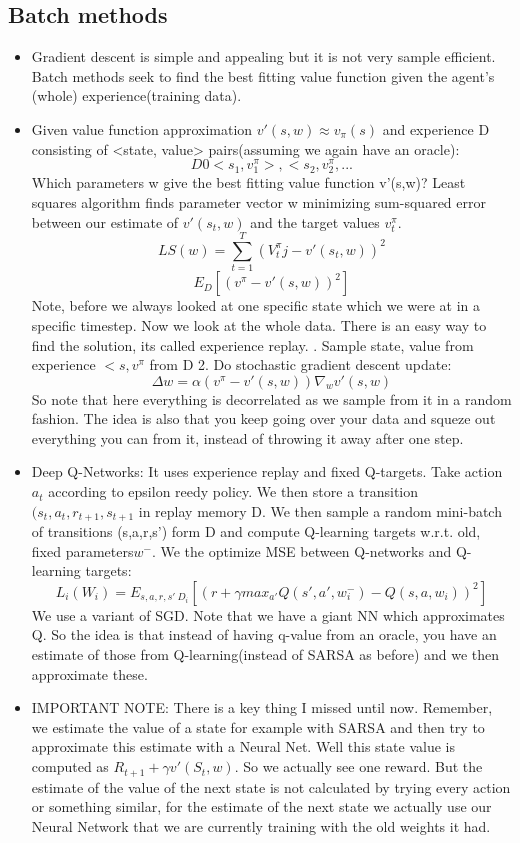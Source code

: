 \documentclass[a4paper]{article}
\begin{document}
\subsection{Batch methods}
\begin{itemize}
    \item Gradient descent is simple and appealing but it is not very sample efficient. Batch methods seek to find the best fitting value function given the agent's (whole) experience(training data). 
    \item Given value function approximation $ v'(s,w) \approx v_{\pi}(s)$ and experience D consisting of <state, value> pairs(assuming we again have an oracle): $$D 0 {<s_1,v_1^{\pi}>, <s_2,v_2^{\pi},...}$$ Which parameters w give the best fitting value function v'(s,w)? Least squares algorithm finds parameter vector w minimizing sum-squared error between our estimate of $v'(s_t,w)$ and the target values $v_t^{\pi}$. 
    $$ LS(w) = \sum_{t=1}^T (V_t^{\pi}j- v'(s_t,w))^2$$
    $$ E_D[(v^{\pi} - v'(s,w))^2]$$
    Note, before we always looked at one specific state which we were at in a specific timestep. Now we look at the whole data. There is an easy way to find the solution, its called experience replay.
    . Sample state, value from experience $<s,v^{\pi}$ from D
    2. Do stochastic gradient descent update: 
    $$ \Delta w = \alpha(v^{\pi} - v'(s,w)) \nabla_w v'(s,w)$$
    So note that here everything is decorrelated as we sample from it in a random fashion. The idea is also that you keep going over your data and squeze out everything you can from it, instead of throwing it away after one step. 
    \item Deep Q-Networks: It uses experience replay and fixed Q-targets. Take action $a_t$ according to epsilon reedy policy. We then store a transition $(s_t, a_t, r_{t+1}, s_{t+1}$ in replay memory D. We then sample a random mini-batch of transitions (s,a,r,s') form D and compute Q-learning targets w.r.t. old, fixed parameters$w^-$. We the optimize MSE between Q-networks and Q-learning targets: $$
    L_i(W_i) = E_{s,a,r,s' ~ D_i}[(r + \gamma max_{a'} Q(s',a',w_i^-) - Q(s,a,w_i))^2]$$
    We use a variant of SGD. 
    \newline 
    Note that we have a giant NN which approximates Q. So the idea is that instead of having q-value from an oracle, you have an estimate of those from Q-learning(instead of SARSA as before) and we then approximate these.
    \item IMPORTANT NOTE: There is a key thing I missed until now. Remember, we estimate the value of a state for example with SARSA and then try to approximate this estimate with a Neural Net. Well this state value is computed as $R_{t+1} + \gamma v'(S_t,w)$. So we actually see one reward. But the estimate of the value of the next state is not calculated by trying every action or something similar, for the estimate of the next state we actually use our Neural Network that we are currently training with the old weights it had. 

\end{itemize}
\end{document}
